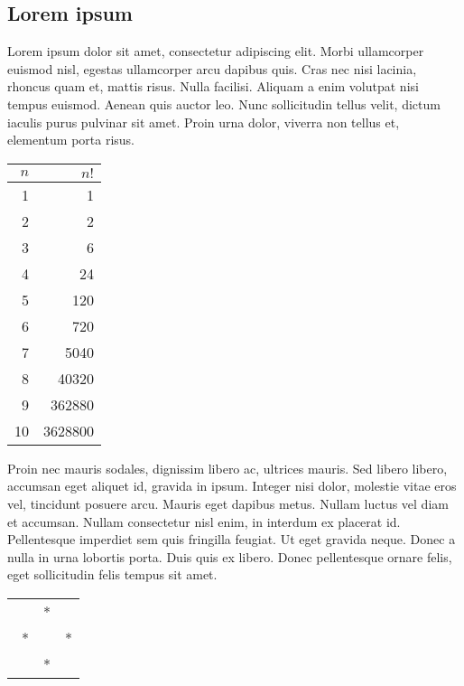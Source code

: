 \documentclass{article}
\begin{document}
\begin{multicols}{2}

\section{Lorem ipsum}

Lorem ipsum dolor sit amet, consectetur adipiscing elit. Morbi ullamcorper euismod nisl, egestas ullamcorper arcu dapibus quis. Cras nec nisi lacinia, rhoncus quam et, mattis risus. Nulla facilisi. Aliquam a enim volutpat nisi tempus euismod. Aenean quis auctor leo. Nunc sollicitudin tellus velit, dictum iaculis purus pulvinar sit amet. Proin urna dolor, viverra non tellus et, elementum porta risus.
\linebreak
\linebreak
\begin{tabular}{|r|r|}
\hline
$n$&$n!$\\
\hline
1&1\\
2&2\\
3&6\\
4&24\\
5&120\\
6&720\\
7&5040\\
8&40320\\
9&362880\\
10&3628800\\
\hline
\end{tabular}
\linebreak
\linebreak
\linebreak
Proin nec mauris sodales, dignissim libero ac, ultrices mauris. Sed libero libero, accumsan eget aliquet id, gravida in ipsum. Integer nisi dolor, molestie vitae eros vel, tincidunt posuere arcu. 
Mauris eget dapibus metus. Nullam luctus vel diam et accumsan. Nullam consectetur nisl enim, in interdum ex placerat id. Pellentesque imperdiet sem quis fringilla feugiat. Ut eget gravida neque. Donec a nulla in urna lobortis porta. Duis quis ex libero. Donec pellentesque ornare felis, eget sollicitudin felis tempus sit amet.

\begin{center}
  \begin{tabular}{ ||| l c r ||| }
    \hline
    \hline
	\hline
     & * &  \\ \
    * &  & * \\
     & * &  \\
    \hline
    \hline
    \hline        
  \end{tabular}
\end{center}


\end{multicols}
\end{document}
